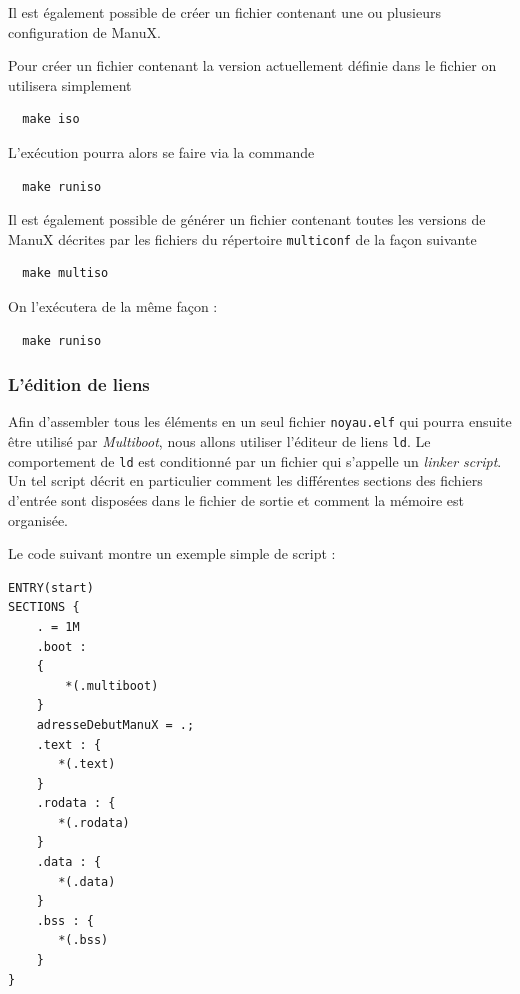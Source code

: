    Il est également possible de créer un fichier \iso contenant une ou
plusieurs configuration de ManuX.

   Pour créer un fichier \iso contenant la version actuellement
définie dans le fichier  on
utilisera simplement

\begin{lstlisting}
  make iso
\end{lstlisting}

   L'exécution pourra alors se faire via la commande

\begin{lstlisting}
  make runiso
\end{lstlisting}

   Il est également possible de générer un fichier \iso contenant
toutes les versions de ManuX décrites par les fichiers du répertoire
\lstinline!multiconf! de la façon suivante

\begin{lstlisting}
  make multiso
\end{lstlisting}

On l'exécutera de la même façon :

\begin{lstlisting}
  make runiso
\end{lstlisting}
   
%
\subsubsection{L'édition de liens}

   Afin d'assembler tous les éléments en un seul fichier
\lstinline!noyau.elf! qui pourra ensuite être utilisé par {\em
  Multiboot}, nous allons utiliser l'éditeur de liens \lstinline!ld!.
Le comportement de \lstinline!ld! est conditionné par un fichier qui
s'appelle un {\em linker script}. Un tel script décrit en particulier
comment les différentes sections des fichiers d'entrée sont disposées
dans le fichier de sortie et comment la mémoire est organisée.


Le code suivant montre un exemple simple de script :

\begin{lstlisting}
ENTRY(start)
SECTIONS {
    . = 1M 
    .boot :
    {
        *(.multiboot)
    }
    adresseDebutManuX = .;
    .text : {
       *(.text)
    }        
    .rodata : {
       *(.rodata)
    }
    .data : {
       *(.data)
    }
    .bss : {
       *(.bss)
    }
}
\end{lstlisting}

